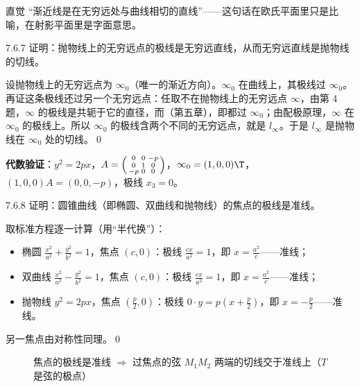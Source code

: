 \begin{intbox}{直觉}
“渐近线是在无穷远处与曲线相切的直线”——这句话在欧氏平面里只是比喻，在射影平面里是字面意思。
\end{intbox}

\begin{ex}{7.6.7}
证明：抛物线上的无穷远点的极线是无穷远直线，从而无穷远直线是抛物线的切线。
\end{ex}
\zheng 设抛物线上的无穷远点为 $\infty_0$（唯一的渐近方向）。$\infty_0$ 在曲线上，其极线过 $\infty_0$。再证这条极线还过另一个无穷远点：任取不在抛物线上的无穷远点 $\infty$，由第 4 题，$\infty$ 的极线是共轭于它的直径，而（第五章），即都过 $\infty_0$；由配极原理，$\infty$ 在 $\infty_0$ 的极线上。所以 $\infty_0$ 的极线含两个不同的无穷远点，就是 $l_\infty$。于是 $l_\infty$ 是抛物线在 $\infty_0$ 处的切线。\qed

\textbf{代数验证}：$y^2=2px$，$A=\begin{psmallmatrix}0&0&-p\\0&1&0\\-p&0&0\end{psmallmatrix}$，$\infty_0=(1,0,0)\T$，$(1,0,0)A=(0,0,-p)$，极线 $x_3=0$。\checkmark

\begin{ex}{7.6.8}
证明：圆锥曲线（即椭圆、双曲线和抛物线）的焦点的极线是准线。
\end{ex}
\zheng 取标准方程逐一计算（用“半代换”）：
\begin{itemize}
\item 椭圆 $\frac{x^2}{a^2}+\frac{y^2}{b^2}=1$，焦点 $(c,0)$：极线 $\frac{cx}{a^2}=1$，即 $x=\frac{a^2}c$——准线；
\item 双曲线 $\frac{x^2}{a^2}-\frac{y^2}{b^2}=1$，焦点 $(c,0)$：极线 $\frac{cx}{a^2}=1$，即 $x=\frac{a^2}c$——准线；
\item 抛物线 $y^2=2px$，焦点 $(\frac p2,0)$：极线 $0\cdot y=p\left(x+\frac p2\right)$，即 $x=-\frac p2$——准线。
\end{itemize}
另一焦点由对称性同理。\qed

\begin{figure}[htbp]
\centering
{}
\caption{焦点的极线是准线 $\Rightarrow$ 过焦点的弦 $M_1M_2$ 两端的切线交于准线上（$T$ 是弦的极点）}
\end{figure}

